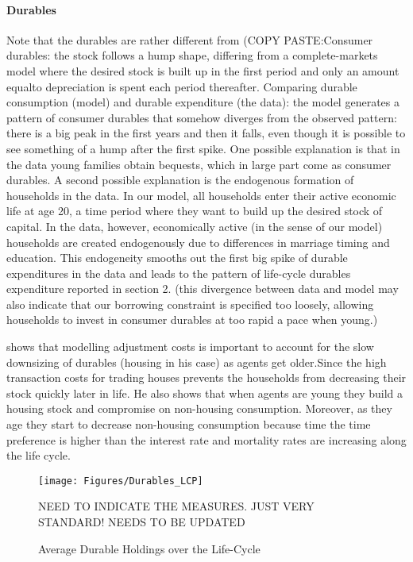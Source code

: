 \documentclass[a4paper,12pt]{article}
\begin{document}
\paragraph{Durables}
Note that the durables are rather different from \citep{FV&K2011} (COPY PASTE:Consumer durables: the stock follows a hump shape, differing from a complete-markets model where the desired stock is built up in the first period and only an amount equalto depreciation is spent each period thereafter. 
Comparing durable consumption (model) and durable expenditure (the data): the model generates a pattern of consumer durables that somehow diverges from the observed pattern: there is a big peak in the first years and then it falls, even though it is possible to see something of a hump after the first spike. 
One possible explanation is that in the data young families obtain bequests, which in large part come as consumer durables. 
A second possible explanation is the endogenous formation of households in the data. In our model, all households enter their active economic life at age 20, a time period where they want to build up the desired stock of capital. In the data, however, economically active (in the sense of our model) households are created endogenously due to differences in marriage timing and education. This endogeneity smooths out the first big spike of durable expenditures in the data and leads to the pattern of life-cycle durables expenditure reported in section 2. (this divergence between data and model may also indicate that our borrowing constraint is specified too loosely, allowing households to invest in consumer durables at too rapid a pace when young.)


\cite{yang2009} shows that modelling adjustment costs is important to account for the slow downsizing of durables (housing in his case) as agents get older.Since the high transaction costs for trading houses prevents the households from decreasing their stock quickly later in life. He also shows that when agents are young they build a housing stock and compromise on non-housing consumption. Moreover, as they age they start to decrease non-housing consumption because  time the time preference is higher than the interest rate and mortality rates are increasing along the life cycle. 


\begin{figure}[!htbp]
\caption{Average Durable Holdings over the Life-Cycle} 
\label{Durable_LCP}	%
\centering
\texttt{[image: Figures/Durables\_LCP]}  %

\begin{minipage}{0.8\linewidth}
\footnotesize{NEED TO INDICATE THE MEASURES. JUST VERY STANDARD! NEEDS TO BE UPDATED}
\end{minipage}

\end{figure}
\end{document}
